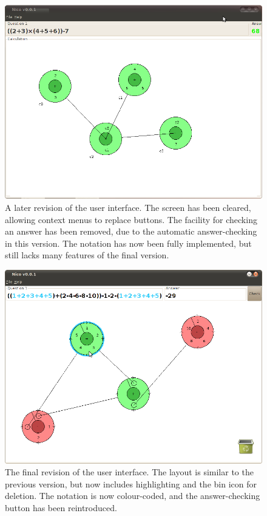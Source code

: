 \documentclass[12pt,twoside,notitlepage,xetex]{report}
\begin{document}
\begin{center}
\begin{figure}[H]
\begin{center}
\includegraphics[width=\textwidth-4cm]{figs/nico_screen_older.png}
\end{center}
\caption{A later revision of the user interface.  The screen has been cleared, allowing context menus to replace buttons.  The facility for checking an answer has been removed, due to the automatic answer-checking in this version.  The notation has now been fully implemented, but still lacks many features of the final version.}
\label{fig:OldApps2}
\end{figure}
\end{center}

\begin{center}
\begin{figure}[H]
\begin{center}
\includegraphics[width=\textwidth-4cm]{figs/nico_screen_new.png}
\end{center}
\caption{The final revision of the user interface.  The layout is similar to the previous version, but now includes highlighting and the bin icon for deletion.  The notation is now colour-coded, and the answer-checking button has been reintroduced.}
\label{fig:OldApps3}
\end{figure}
\end{center}
\end{document}

